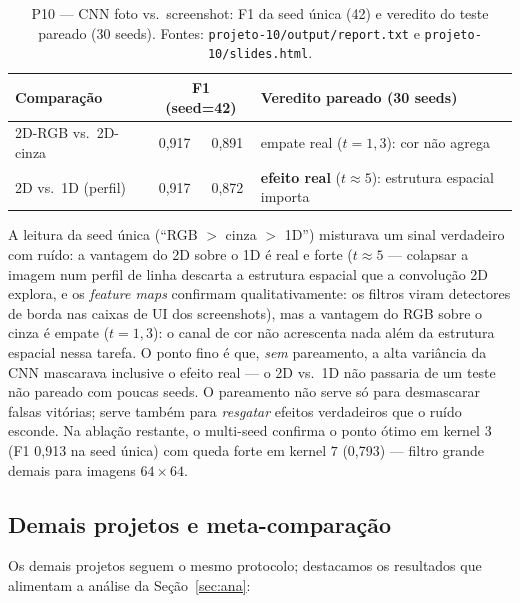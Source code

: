\documentclass[12pt]{article}
\begin{document}
\begin{table}[htb]
\centering
\caption{P10 --- CNN foto vs.\ screenshot: F1 da seed única (42) e veredito
do teste pareado (30 seeds). Fontes: \texttt{projeto-10/output/report.txt} e
\texttt{projeto-10/slides.html}.}
\label{tab:p10}
\begin{tabular}{lccl}
\toprule
Comparação & \multicolumn{2}{c}{F1 (seed=42)} & Veredito pareado (30 seeds)\\
\midrule
2D-RGB vs.\ 2D-cinza & 0{,}917 & 0{,}891 &
  empate real ($t = 1{,}3$): cor não agrega \\
2D vs.\ 1D (perfil)  & 0{,}917 & 0{,}872 &
  \textbf{efeito real} ($t \approx 5$): estrutura espacial importa \\
\bottomrule
\end{tabular}
\end{table}

A leitura da seed única (``RGB $>$ cinza $>$ 1D'') misturava um sinal
verdadeiro com ruído: a vantagem do 2D sobre o 1D é real e forte ($t \approx
5$ --- colapsar a imagem num perfil de linha descarta a estrutura espacial
que a convolução 2D explora, e os \emph{feature maps} confirmam
qualitativamente: os filtros viram detectores de borda nas caixas de UI dos
screenshots), mas a vantagem do RGB sobre o cinza é empate ($t = 1{,}3$): o
canal de cor não acrescenta nada além da estrutura espacial nessa tarefa. O
ponto fino é que, \emph{sem} pareamento, a alta variância da CNN mascarava
inclusive o efeito real --- o 2D vs.\ 1D não passaria de um teste não
pareado com poucas seeds. O pareamento não serve só para desmascarar falsas
vitórias; serve também para \emph{resgatar} efeitos verdadeiros que o ruído
esconde. Na ablação restante, o multi-seed confirma o ponto ótimo em kernel
$3$ (F1 0{,}913 na seed única) com queda forte em kernel $7$ (0{,}793) ---
filtro grande demais para imagens $64 \times 64$.

\subsection{Demais projetos e meta-comparação}\label{sec:res-outros}

Os demais projetos seguem o mesmo protocolo; destacamos os resultados que
alimentam a análise da Seção~\ref{sec:ana}:
\end{document}
